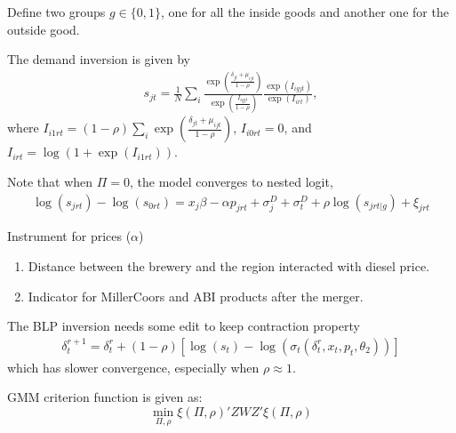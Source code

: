 \documentclass[11pt]{elegantbook}
\begin{document}
Define two groups $g\in\{0,1\}$, one for all the inside goods and another one for the outside good.

The demand inversion is given by
\begin{equation}
    \begin{aligned}
        s_{jt}=\frac{1}{N}\sum_i\frac{\exp\left(\frac{\delta_{jt}+\mu_{ijt}}{1-\rho}\right)}{\exp\left(\frac{I_{igjt}}{1-\rho}\right)}\frac{\exp\left(I_{igjt}\right)}{\exp\left(I_{irt}\right)},
    \end{aligned}
    \nonumber
\end{equation}
where $I_{i1rt}=(1-\rho)\sum_i\exp\left(\frac{\delta_{jt}+\mu_{ijt}}{1-\rho}\right)$, $I_{i0rt}=0$, and $I_{irt}=\log\left(1+\exp(I_{i1rt})\right)$.

\begin{note}
    Note that when $\Pi=0$, the model converges to nested logit,
    \begin{equation}
        \begin{aligned}
            \log\left(s_{jrt}\right)-\log\left(s_{0rt}\right)=x_j\beta-\alpha p_{jrt}+\sigma_j^D+\sigma_t^D+\rho\log\left(s_{jrt|g}\right)+\xi_{jrt}
        \end{aligned}
        \nonumber
    \end{equation}
\end{note}

Instrument for prices ($\alpha$)
\begin{enumerate}[$\circ$]
    \item Distance between the brewery and the region interacted with diesel price.
    \item Indicator for MillerCoors and ABI products after the merger.
\end{enumerate}

\begin{note}
    The BLP inversion needs some edit to keep contraction property
    \begin{equation}
        \begin{aligned}
            \delta_t^{r+1}=\delta_t^r+(1-\rho)[\log\left(s_t\right)-\log\left(\sigma_{t}\left(\delta_t^r,x_t,p_t,\theta_2\right)\right)]
        \end{aligned}
        \nonumber
    \end{equation}
    which has slower convergence, especially when $\rho\approx 1$.
\end{note}

GMM criterion function is given as: $$\min_{\Pi,\rho}\xi(\Pi,\rho)'ZWZ'\xi(\Pi,\rho)$$
\end{document}

